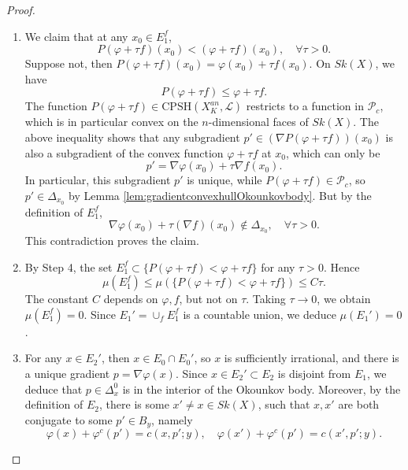 \documentclass[a4paper]{article}
\theoremstyle{definition}
\begin{document}
\begin{proof}
\begin{enumerate}
			
			
			Given any model function $f$,  let $E_1^f$ be the subset consisting of the points $x\in E_1'$, such that $f$ is affine linear in some open neighbourhood of $x\in Sk(X)$, and $\nabla \varphi(x) + \tau \nabla f (x)\notin \Delta_x$ at the point $x$ for any $\tau>0$. This means that at the boundary point $p\in \partial \Delta_x$, the vector $\nabla f(x)$ points outside of the convex Okounkov body $\Delta_x$. 
			
			
		We notice that at any $x\in E_1'$, one can find such a model function $f$, so 
	$
		E_1'= \bigcup_f  E_1^f.
	$
			
			\item  We claim that at any $x_0\in E_1^f$,
			\begin{equation}
			 P(\varphi+\tau f) (x_0) < ( \varphi+\tau  f)(x_0)  ,\quad \forall \tau>0.
			\end{equation}
	Suppose not, then $P(\varphi+\tau f)(x_0)= \varphi(x_0) +\tau  f(x_0)$. On $ Sk(X)$, we have
			\[
			 P(\varphi+\tau f) \leq   \varphi+\tau  f .
			\]
	The function $P(\varphi+\tau f) \in  \text{CPSH}(X_K^{an},\mathcal{L})$  restricts to a function in $\mathcal{P}_c$, which is in particular convex on the $n$-dimensional faces of $Sk(X)$. The above inequality shows that any subgradient $p'\in (\nabla  P(\varphi+\tau f)  )(x_0)$ is also a subgradient of the convex function $\varphi+\tau  f$ at $x_0$, which can only be 
	\[
	p'= \nabla \varphi(x_0) +\tau \nabla f(x_0).
	\]
	In particular, this subgradient $p'$ is unique, while $P(\varphi+\tau f)\in \mathcal{P}_c$, so $p'\in \Delta_{x_0}$ by Lemma \ref{lem:gradientconvexhullOkounkovbody}. But by the definition of $E_1^f$, 
	\[
	 \nabla \varphi(x_0) +\tau (\nabla f)(x_0) \notin \Delta_{x_0}, \quad \forall \tau>0.
	\]
			This contradiction proves the claim.
			
			
			\item By Step 4, the set $E_1^f\subset \{    P(\varphi+\tau f)  <  \varphi+\tau  f       \}$ for any $\tau>0$. Hence
			\begin{equation}
			\mu(E_1^f) \leq \mu(    \{    P(\varphi+\tau f) <  \varphi+\tau  f        \}    ) \leq C\tau.
			\end{equation}
			The constant $C$ depends on $\varphi, f$, but not on $\tau$. Taking $\tau\to 0$, we obtain $\mu(E_1^f)=0$. Since $E_1'= \cup_f E_1^f$ is a countable union, we deduce $\mu(E_1')=0$.
			
			
			
		\item  For any $x\in E_2'$, then $x\in E_0\cap E_0'$, so $x$ is sufficiently irrational, and there is a unique gradient $p=\nabla \varphi(x)$. Since $x\in E_2'\subset E_2$ is disjoint from $E_1$, we deduce that $p\in \Delta_x^0$ is in the interior of the Okounkov body. 
		Moreover, by the definition of $E_2$, there is some $x'\neq x\in Sk(X)$, such that $x,x'$ are both conjugate to some $p'\in B_y$, namely
		\[
		\varphi(x)+ \varphi^c(p')= c(x,p';y),\quad \varphi(x')+ \varphi^c(p')= c(x',p';y).
		\]
		

\end{enumerate}
\end{proof}
\end{document}
